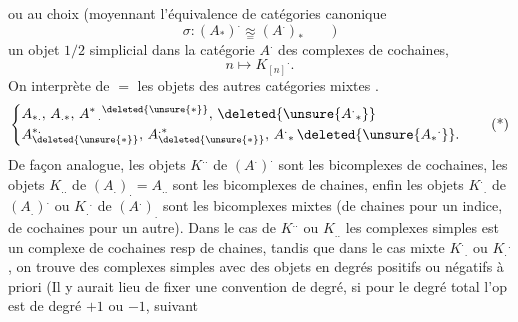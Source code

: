ou au choix (moyennant  l'équivalence de catégories canonique
\[
 \sigma:(A_*)^{.}\underset{=}{\approx}(A^{.})_*\qquad)
\]
un objet $1/2$ simplicial dans la catégorie $A^{.}$ des complexes de cochaines, 
\[
 n\longmapsto K_{[n]}{}^{.}.
\]
On interprète de $=$ les objets des autres catégories mixtes .
\[
 \left\{\begin{aligned}
 &A_{*.},\, A_{.*},\, A^*{}_{\,.}{}^{\deleted{\unsure{*}}},\,\deleted{\unsure{A^{.}{}_*}}\\
 &A^{*.}_{\deleted{\unsure{*}}},\, A^{.*}_{\deleted{\unsure{*}}},\, A^{.}{}_*\,\deleted{\unsure{A_*{}^{.}}}.
 \end{aligned}\right.\tag*{(*)}
\]
De façon analogue, les objets $K^{..}$ de $(A^{.})^{.}$ sont les bicomplexes de cochaines, les objets $K_{..}$ de $(A_.)_.=A_{..}$ sont les bicomplexes de chaines, enfin les objets $K^{.}{}_.$ de $(A_.)^{.}$ ou $K_.{}^{.}$ de $(A^{.})_.$ sont les bicomplexes mixtes  (de chaines pour un indice, de cochaines pour un autre). Dans le cas de $K^{..}$ ou $K_{..}$ les complexes simples  est un complexe de cochaines resp de chaines, tandis que dans le cas mixte $K^{.}{}_.$ ou $K_.{}^{.}$, on trouve des complexes simples avec des objets en degrés positifs ou négatifs à priori (Il y aurait lieu de fixer une convention de degré, si pour le degré total l'op  est de degré $+1$ ou $-1$, suivant

